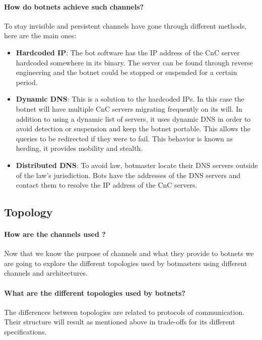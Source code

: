 \paragraph{How do botnets achieve such channels?}
To stay invisible and persistent channels have gone through different methods, here are the main ones: 
\begin{itemize}[noitemsep]
\item \textbf{Hardcoded IP}: The bot software has the IP address of the CnC server hardcoded somewhere in its binary. The server can be found through reverse engineering and the botnet could be stopped or suspended for a certain period.
\item \textbf{Dynamic DNS}: This is a solution to the hardcoded IPs. In this case the botnet will have multiple CnC servers migrating frequently on its will. In addition to using a dynamic list of servers, it uses dynamic DNS in order to avoid detection or suspension and keep the botnet portable. This allows the queries to be redirected if they were to fail. This behavior is known as herding, it provides mobility and stealth.
\item \textbf{Distributed DNS}: To avoid law, botmaster locate their DNS servers outside of the law's jurisdiction. Bots have the addresses of the DNS servers and contact them to resolve the IP address of the CnC servers.
\end{itemize}

\subsection{Topology}
\paragraph{How are the channels used ?}
Now that we know the purpose of channels and what they provide to botnets we are going to explore the different topologies used by botmasters using different channels and architectures.

\paragraph{What are the different topologies used by botnets?}
The differences between topologies are related to protocols of communication. Their structure will result as mentioned above in trade-offs for its different specifications.

